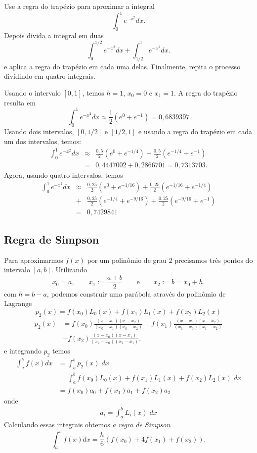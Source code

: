 \begin{ex}
Use a regra do trapézio para aproximar a integral
$$
\int_0^1e^{-x^2}dx.
$$
Depois divida a integral em duas
$$
\int_0^{1/2}e^{-x^2}dx+\int_{1/2}^{1}e^{-x^2}dx.
$$
e aplica a regra do trapézio em cada uma delas. Finalmente, repita o processo dividindo em quatro integrais.
\end{ex}
Usando o intervalo $[0,1]$, temos $h=1$, $x_0=0$ e $x_1=1$. A regra do trapézio resulta em
$$
\int_0^1e^{-x^2}dx\approx \frac{1}{2}(e^{0}+e^{-1})=0,6839397
$$
Usando dois intervalos, $[0,1/2]$ e $[1/2,1]$ e usando a regra do trapézio em cada um dos intervalos, temos:
\begin{eqnarray*}
\int_0^1e^{-x^2}dx &\approx& \frac{0,5}{2}\left(e^{0}+e^{-1/4}\right) + \frac{0,5}{2}\left(e^{-1/4}+e^{-1}\right) \\
&=& 0,4447002+0,2866701 =0,7313703.
\end{eqnarray*}
Agora, usando quatro intervalos, temos
\begin{eqnarray*}
\int_0^1e^{-x^2}dx &\approx& \frac{0,25}{2}\left(e^{0}+e^{-1/16}\right) + \frac{0,25}{2}\left(e^{-1/16}+e^{-1/4}\right) \\
&+& \frac{0,25}{2}\left(e^{-1/4}+e^{-9/16}\right)+\frac{0,25}{2}\left(e^{-9/16}+e^{-1}\right) \\
&=& 0,7429841
\end{eqnarray*}

\subsection{Regra de Simpson}
Para aproximarmos $f(x)$ por um polinômio de grau $2$ precisamos três pontos do intervalo $[a,b]$. Utilizando 
$$
x_0=a,\qquad x_1:=\frac{a+b}{2}\qquad \text{e}\qquad x_2:=b=x_0+h.
$$
com $h =b-a$, podemos construir uma parábola através do polinômio de Lagrange 
\begin{equation*}
    p_2(x) = f(x_0)L_0(x) + f(x_1)L_1(x)  + f(x_2)L_2(x)
\end{equation*}
\begin{equation*}
  \begin{split}
    p_2(x) &= f(x_0)\frac{(x-x_1)(x-x_2)}{(x_0-x_1)(x_0-x_2)} + f(x_1)\frac{(x-x_0)(x-x_2)}{(x_1-x_0)(x_1-x_2)}\\
           &+ f(x_2)\frac{(x-x_0)(x-x_1)}{(x_2-x_0)(x_2-x_1)}.
  \end{split}
\end{equation*}
e integrando $p_2$ temos
\begin{eqnarray}
\int_a^bf(x)dx &=\int_a^b p_2(x) \;dx \\ 
               &=\int_a^b f(x_0)L_0(x) + f(x_1)L_1(x)  + f(x_2)L_2(x) \;dx \\  
               &=f(x_0) a_0 + f(x_1)a_1  + f(x_2)a_2  
\end{eqnarray}
onde
\begin{eqnarray}
  a_i = \int_a^b L_i(x) \;dx  
\end{eqnarray}
Calculando essas integrais obtemos \emph{a regra de Simpson}
$$
\int_a^bf(x)dx=\frac{h}{6}\left(f(x_0)+4f(x_1)+f(x_2)\right).
$$


